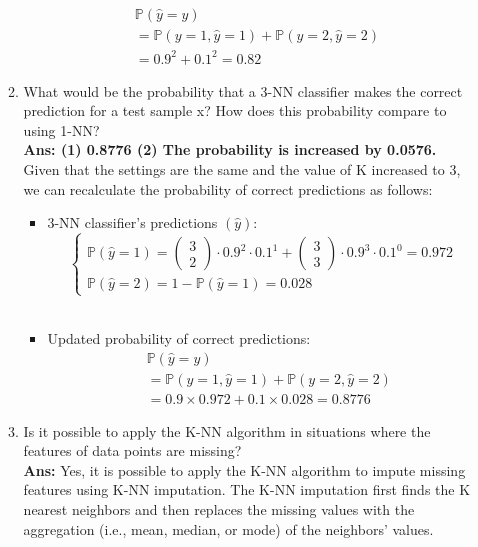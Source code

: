 \documentclass{article}
\theoremstyle{definition}
\theoremstyle{remark}
\begin{document}
\begin{enumerate}[font={\Large\bfseries},left=0pt]
\begin{tcolorbox}
\begin{enumerate}
        \begin{align}
            &\mathbb{P}(\hat{y} = y) \\
            &= \mathbb{P}(y = 1, \hat{y} = 1) + \mathbb{P}(y = 2, \hat{y} = 2) \\
            &= 0.9^2 + 0.1^2 = 0.82
        \end{align}

        \item What would be the probability that a 3-NN classifier makes the correct prediction for a test sample x? How does this probability compare to using 1-NN? \\
        \textbf{Ans: (1) 0.8776 (2) The probability is increased by 0.0576.} \\
        Given that the settings are the same and the value of K increased to 3, we can recalculate the probability of correct predictions as follows:
        \begin{itemize}
            \item 3-NN classifier's predictions $(\hat{y})$: \\
            
            $$\begin{cases}
                \mathbb{P}(\hat{y} = 1) = \begin{pmatrix}3 \\ 2\end{pmatrix} \cdot 0.9^2 \cdot 0.1^1 + \begin{pmatrix}3 \\ 3\end{pmatrix} \cdot 0.9^3 \cdot 0.1^0 = 0.972 \\
                \mathbb{P}(\hat{y} = 2) = 1 - \mathbb{P}(\hat{y} = 1) = 0.028 
            \end{cases}$$ \\

            \item Updated probability of correct predictions:
            \begin{align}
                &\mathbb{P}(\hat{y} = y) \\
                &= \mathbb{P}(y = 1, \hat{y} = 1) + \mathbb{P}(y = 2, \hat{y} = 2) \\
                &= 0.9 \times 0.972 + 0.1 \times 0.028 = 0.8776
            \end{align}
        \end{itemize}


        \item Is it possible to apply the K-NN algorithm in situations where the features of data points are missing? \\
        \textbf{Ans:} Yes, it is possible to apply the K-NN algorithm to impute missing features using K-NN imputation. The K-NN imputation first finds the K nearest neighbors and then replaces the missing values with the aggregation (i.e., mean, median, or mode) of the neighbors' values.
        

\end{enumerate}
\end{tcolorbox}
\end{enumerate}
\end{document}
